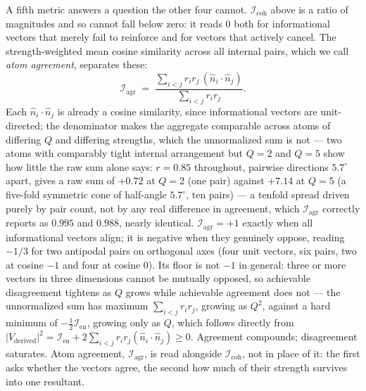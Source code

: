 \documentclass[12pt, a4paper]{article}
\begin{document}
A fifth metric answers a question the other four cannot. $\mathcal{I}_{\mathrm{coh}}$ above is a ratio of magnitudes and so cannot fall below
zero: it reads $0$ both for informational vectors that merely fail
to reinforce and for vectors that actively cancel. The
strength-weighted mean cosine similarity across all internal pairs,
which we call \emph{atom agreement}, separates these:
\begin{equation}
    \mathcal{I}_{\mathrm{agr}} \;=\;
    \frac{\sum_{i<j} r_i r_j\,(\hat n_i\cdot\hat n_j)}
         {\sum_{i<j} r_i r_j}.
    \label{eq:internal_alignment}
\end{equation}
Each $\hat n_i\cdot\hat n_j$ is already a cosine similarity, since
informational vectors are unit-directed; the denominator makes the
aggregate comparable across atoms of differing $Q$ and differing
strengths, which the unnormalized sum is not --- two atoms with
comparably tight internal arrangement but $Q=2$ and $Q=5$ show how
little the raw sum alone says: $r=0.85$ throughout, pairwise
directions $5.7^\circ$ apart, gives a raw sum of $+0.72$ at $Q=2$
(one pair) against $+7.14$ at $Q=5$ (a five-fold symmetric cone of
half-angle $5.7^\circ$, ten pairs) --- a tenfold spread driven purely by
pair count, not by any real difference in agreement, which
$\mathcal{I}_{\mathrm{agr}}$ correctly reports as $0.995$ and $0.988$,
nearly identical. $\mathcal{I}_{\mathrm{agr}}=+1$ exactly when all
informational vectors align; it is negative when they genuinely
oppose, reading $-1/3$ for two antipodal pairs on orthogonal axes
(four unit vectors, six pairs, two at cosine $-1$ and four at
cosine $0$). Its floor is not $-1$ in general: three
or more vectors in three dimensions cannot be mutually opposed, so
achievable disagreement tightens as $Q$ grows while achievable
agreement does not --- the unnormalized sum has maximum
$\sum_{i<j}r_ir_j$, growing as $Q^2$, against a hard minimum of
$-\tfrac{1}{2}\mathcal{I}_{\mathrm{en}}$, growing only as $Q$, which
follows directly from $\lvert V_{\text{derived}}\rvert^2 =
\mathcal{I}_{\mathrm{en}} + 2\sum_{i<j} r_ir_j(\hat n_i\cdot\hat n_j)
\ge 0$. Agreement compounds; disagreement saturates.
Atom agreement, $\mathcal{I}_{\mathrm{agr}}$, is read alongside $\mathcal{I}_{\mathrm{coh}}$, not in place
of it: the first asks whether the vectors agree, the second how much
of their strength survives into one resultant.
\end{document}
